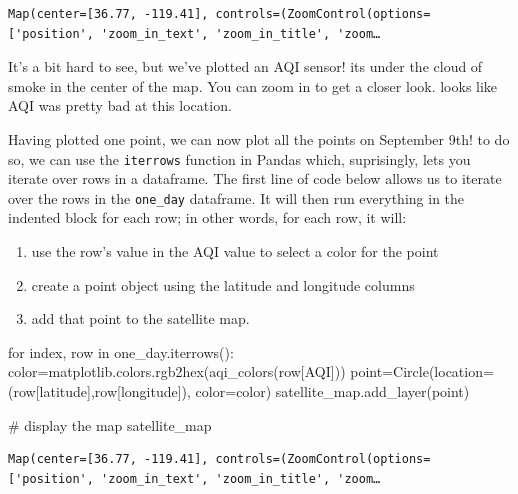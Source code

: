 \documentclass[
  letterpaper,
  DIV=11,
  numbers=noendperiod]{scrreprt}
\newenvironment{Shaded}{\begin{snugshade}}{\end{snugshade}}
\newcommand{\CommentTok}[1]{\textcolor[rgb]{0.37,0.37,0.37}{#1}}
\newcommand{\ControlFlowTok}[1]{\textcolor[rgb]{0.00,0.23,0.31}{#1}}
\newcommand{\KeywordTok}[1]{\textcolor[rgb]{0.00,0.23,0.31}{#1}}
\newcommand{\NormalTok}[1]{\textcolor[rgb]{0.00,0.23,0.31}{#1}}
\newcommand{\OperatorTok}[1]{\textcolor[rgb]{0.37,0.37,0.37}{#1}}
\newcommand{\StringTok}[1]{\textcolor[rgb]{0.13,0.47,0.30}{#1}}
\providecommand{\tightlist}{%
  \setlength{\itemsep}{0pt}\setlength{\parskip}{0pt}}\usepackage{longtable,booktabs,array}
\begin{document}
\begin{verbatim}
Map(center=[36.77, -119.41], controls=(ZoomControl(options=['position', 'zoom_in_text', 'zoom_in_title', 'zoom…
\end{verbatim}

It's a bit hard to see, but we've plotted an AQI sensor! its under the
cloud of smoke in the center of the map. You can zoom in to get a closer
look. looks like AQI was pretty bad at this location.

Having plotted one point, we can now plot all the points on September
9th! to do so, we can use the \texttt{iterrows} function in Pandas
which, suprisingly, lets you iterate over rows in a dataframe. The first
line of code below allows us to iterate over the rows in the
\texttt{one\_day} dataframe. It will then run everything in the indented
block for each row; in other words, for each row, it will:

\begin{enumerate}
\def\labelenumi{\arabic{enumi}.}
\tightlist
\item
  use the row's value in the AQI value to select a color for the point
\item
  create a point object using the latitude and longitude columns
\item
  add that point to the satellite map.
\end{enumerate}

\begin{Shaded}
\begin{Highlighting}[]
\ControlFlowTok{for}\NormalTok{ index, row }\KeywordTok{in}\NormalTok{ one\_day.iterrows():}
\NormalTok{  color}\OperatorTok{=}\NormalTok{matplotlib.colors.rgb2hex(aqi\_colors(row[}\StringTok{\textquotesingle{}AQI\textquotesingle{}}\NormalTok{]))}
\NormalTok{  point}\OperatorTok{=}\NormalTok{Circle(location}\OperatorTok{=}\NormalTok{(row[}\StringTok{\textquotesingle{}latitude\textquotesingle{}}\NormalTok{],row[}\StringTok{\textquotesingle{}longitude\textquotesingle{}}\NormalTok{]), color}\OperatorTok{=}\NormalTok{color)}
\NormalTok{  satellite\_map.add\_layer(point)}

\CommentTok{\# display the map}
\NormalTok{satellite\_map}
\end{Highlighting}
\end{Shaded}

\begin{verbatim}
Map(center=[36.77, -119.41], controls=(ZoomControl(options=['position', 'zoom_in_text', 'zoom_in_title', 'zoom…
\end{verbatim}
\end{document}
